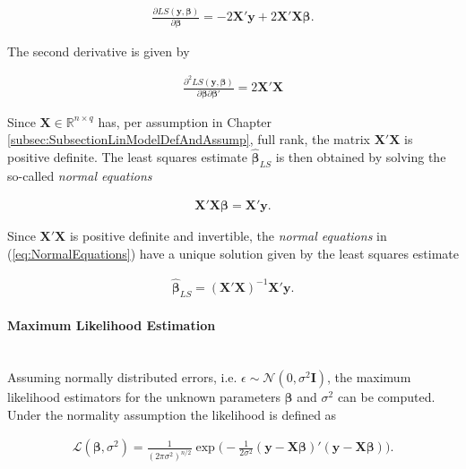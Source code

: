 \documentclass[10pt,a4paper]{article}
\newcommand{\subsubsubsection}[1]{\paragraph{#1}\mbox{}\\}
\begin{document}
\begin{align} \label{eq:LS_1st_derivative}
	\frac{\partial LS(\boldsymbol{y}, \boldsymbol{\beta})}{\partial \boldsymbol{\beta}} = -2\boldsymbol{X}' \boldsymbol{y} + 2\boldsymbol{X}'\boldsymbol{X} \boldsymbol{\beta}.
\end{align}

The second derivative is given by

\begin{align} \label{eq:LS_2nd_derivative}
	\frac{\partial^2LS(\boldsymbol{y}, \boldsymbol{\beta})}{\partial \boldsymbol{\beta} \partial \boldsymbol{\beta}'} = 2\boldsymbol{X}'\boldsymbol{X}
\end{align}
	
Since $\boldsymbol{X} \in \mathbb{R}^{n \times q}$ has, per assumption in Chapter \ref{subsec:SubsectionLinModelDefAndAssump},  full rank, the matrix $ \boldsymbol{X}'\boldsymbol{X}$ is positive definite. The least squares estimate $\boldsymbol{\hat{\beta}}_{LS}$ is then obtained by solving the so-called \emph{normal equations}

\begin{align} \label{eq:NormalEquations}
	\boldsymbol{X}' \boldsymbol{X} \boldsymbol{\beta} = \boldsymbol{X}' \boldsymbol{y}.
\end{align}

Since $\boldsymbol{X}'\boldsymbol{X}$ is positive definite and invertible, the \emph{normal equations} in (\ref{eq:NormalEquations}) have a unique solution given by the least squares estimate

\begin{align} \label{eq:LS_estimator}
	\boldsymbol{\hat{\beta}}_{LS} = (\boldsymbol{X}'\boldsymbol{X})^{-1} \boldsymbol{X}'\boldsymbol{y}.
\end{align}

\subsubsubsection{Maximum Likelihood Estimation}

Assuming normally distributed errors, i.e. $\epsilon \sim \mathcal N(0, \sigma^2 \boldsymbol{I})$, the maximum likelihood estimators for the unknown parameters $\boldsymbol{\beta}$ and $\sigma^2$ can be computed. \cite{wood2017generalized} Under the normality assumption the likelihood is defined as

\begin{align} \label{eq:likelihood}
	\mathcal{L}(\boldsymbol{\beta}, \sigma^2) = \frac{1}{(2\pi\sigma^2)^{n/2}} \exp \Big( -\frac{1}{2\sigma^2}(\boldsymbol{y} - \boldsymbol{X} \boldsymbol{\beta})'(\boldsymbol{y} - \boldsymbol{X} \boldsymbol{\beta}) \Big).
\end{align}
\end{document}
